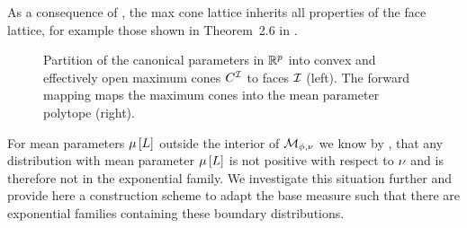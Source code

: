 As a consequence of , the max cone lattice inherits all properties of the face lattice, for example those shown in Theorem~2.6 in \cite{ziegler_lectures_2013}.

\begin{figure}
    \begin{center}
        
    \end{center}
    \caption{
        Partition of the canonical parameters in $\mathbb{R}^{p}$ into convex and effectively open maximum cones $C^{\mathcal{I}}$ to faces $\mathcal{I}$ (left).
        The forward mapping maps the maximum cones into the mean parameter polytope (right).
    }\label{fig:max_cone_sketch}
\end{figure}




For mean parameters $\mu\left[L\right]$ outside the interior of $\mathcal{M}_{\phi,\nu}$ we know by , that any distribution with mean parameter $\mu\left[L\right]$ is not positive with respect to $\nu$ and is therefore not in the exponential family.
We investigate this situation further and provide here a construction scheme to adapt the base measure such that there are exponential families containing these boundary distributions.


